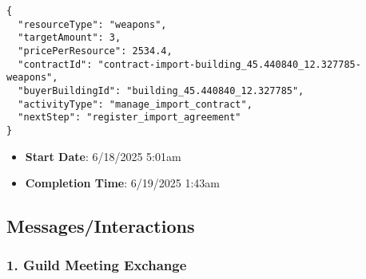 \documentclass[11pt,a4paper]{article}
\begin{document}
\begin{lstlisting}
{
  "resourceType": "weapons",
  "targetAmount": 3,
  "pricePerResource": 2534.4,
  "contractId": "contract-import-building_45.440840_12.327785-weapons",
  "buyerBuildingId": "building_45.440840_12.327785",
  "activityType": "manage_import_contract",
  "nextStep": "register_import_agreement"
}
\end{lstlisting}

\begin{itemize}
\item \textbf{Start Date}: 6/18/2025 5:01am
\item \textbf{Completion Time}: 6/19/2025 1:43am
\end{itemize}

\subsection{Messages/Interactions}

\subsubsection{1. Guild Meeting Exchange}
\end{document}
